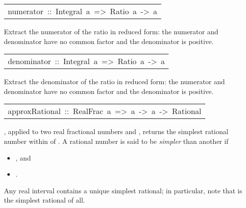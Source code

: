 \begin{haddockdesc}
\item[\begin{tabular}{@{}l}
numerator\ ::\ Integral\ a\ =>\ Ratio\ a\ ->\ a
\end{tabular}]\haddockbegindoc
Extract the numerator of the ratio in reduced form:
 the numerator and denominator have no common factor and the denominator
 is positive.
\par

\end{haddockdesc}
\begin{haddockdesc}
\item[\begin{tabular}{@{}l}
denominator\ ::\ Integral\ a\ =>\ Ratio\ a\ ->\ a
\end{tabular}]\haddockbegindoc
Extract the denominator of the ratio in reduced form:
 the numerator and denominator have no common factor and the denominator
 is positive.
\par

\end{haddockdesc}
\begin{haddockdesc}
\item[\begin{tabular}{@{}l}
approxRational\ ::\ RealFrac\ a\ =>\ a\ ->\ a\ ->\ Rational
\end{tabular}]\haddockbegindoc
{}, applied to two real fractional numbers  and ,
 returns the simplest rational number within  of .
 A rational number  is said to be \emph{simpler} than another  if
\par
\begin{itemize}
\item
 , and
\par

\item
 .
\par

\end{itemize}
Any real interval contains a unique simplest rational;
 in particular, note that  is the simplest rational of all.
\par

\end{haddockdesc}
